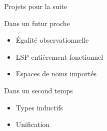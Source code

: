 \documentclass[12pt, aspectratio=169]{beamer}
\begin{document}
        \begin{frame}{Projets pour la suite}
            
            \begin{block}{Dans un futur proche}
                
                \begin{itemize}
                    \item Égalité observationnelle \pause
                    \item LSP entièrement fonctionnel \pause
                    \item Espaces de noms importés
                \end{itemize}

            \end{block}

            \vfill
            \pause

            \begin{block}{Dans un second temps}
                
                \begin{itemize}
                    \item Types inductifs \pause
                    \item Unification
                \end{itemize}

            \end{block}

        \end{frame}
\end{document}
